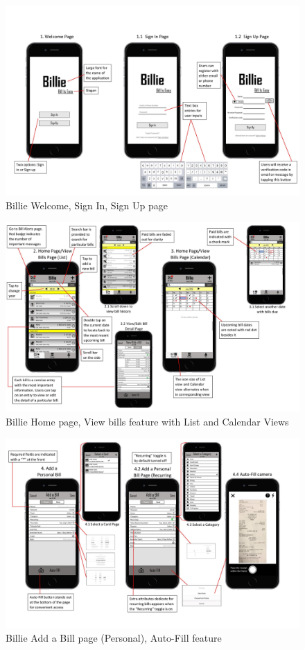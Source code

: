 \documentclass{sigchi}
\begin{document}
 \begin{figure}[h!]
\centering
  \includegraphics[width=1\columnwidth]{User-flow-page-001.jpg}
  \caption{Billie Welcome, Sign In, Sign Up page}
  \label{fig:figure40}
\end{figure}
 \begin{figure}[h!]
\centering
  \includegraphics[width=1\columnwidth]{User-flow-page-002.jpg}
  \caption{Billie Home page, View bills feature with List and Calendar Views}
  \label{fig:figure41}
\end{figure} 
 \begin{figure}[h!]
\centering
  \includegraphics[width=1\columnwidth]{User-flow-page-003.jpg}
  \caption{Billie Add a Bill page (Personal), Auto-Fill feature}
  \label{fig:figure42}
\end{figure} 
\end{document}
